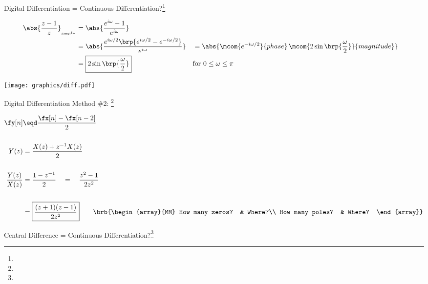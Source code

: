  
Digital Differentiation = Continuous Differentiation?\footnote{}
 
\begin{align*}
  \abs{\frac{z-1}{z}}_{z=e^{i\omega}}
    &= \abs{\frac{e^{i\omega}-1}
                 {e^{i\omega}}
           }
  \\&= \abs{\frac{e^{i\omega/2}\brp{e^{i\omega/2}-e^{-i\omega/2}}}
                 {e^{i\omega}}
           }
   &&= \abs{\mcom{e^{-i\omega/2}}{phase}\,\mcom{{2\sin\brp{\frac{\omega}{2}}}}{magnitude}}
  \\&= \boxed{{2\sin\brp{\frac{\omega}{2}}}} 
    && \text{for $0\le\omega\le\pi$}
\end{align*}


\texttt{[image: graphics/diff.pdf]}


Digital Differentiation Method \#2: \footnote{}
 
\begin{align*}
  \fy[n]
    &\eqd \frac{\fx[n] - \fx[n-2]}{2}
  \\\\
  Y(z) &= \frac{X(z) + z^{-1}X(z)}{2}
  \\\\
  \frac{Y(z)}{X(z)} &= \frac{1-z^{-1}}{2} \quad=\quad {\frac{z^2-1}{2z^2}}
  \\\\
                    &= \boxed{\frac{(z+1)(z-1)}{2z^2}} 
  \qquad\brb{\begin{array}{MM}
    How many zeros? & Where?\\
    How many poles? & Where?
  \end{array}}
\end{align*}


 
Central Difference = Continuous Differentiation?\footnote{}
 
